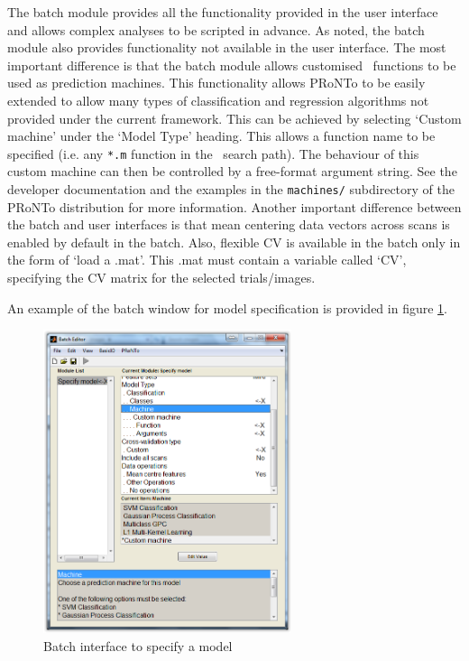 The batch module provides all the functionality provided in the user interface and allows complex analyses to be scripted in advance. As noted,
the batch module also provides functionality not available in the user interface. The most important difference is that the batch module allows
customised \matlab \ functions to be used as prediction machines. This functionality allows PRoNTo to be easily extended to allow many types of
classification and regression algorithms not provided under the current framework. This can be achieved by selecting `Custom machine' under the
`Model Type' heading. This allows a function name to be specified (i.e. any \texttt{*.m} function in the \matlab \ search path). The behaviour of this custom machine can then be controlled by a free-format argument string. See the developer documentation and the examples in the \texttt{machines/} subdirectory of the PRoNTo distribution for more information. Another important difference between the batch and user interfaces is that mean centering data vectors across scans is enabled by default in the batch. Also, flexible CV is available in the batch only in the form of `load a .mat'. This .mat must contain a variable called `CV', specifying the CV matrix for the selected trials/images.

An example of the batch window for model specification is provided in figure \ref{fig_batch_model}.

\begin{figure}[!h]
\begin{center}
\includegraphics[height=3.5in]{images/prt_batch_model.PNG}
\caption{Batch interface to specify a model}
 \label{fig_batch_model}
\end{center}
\end{figure}

